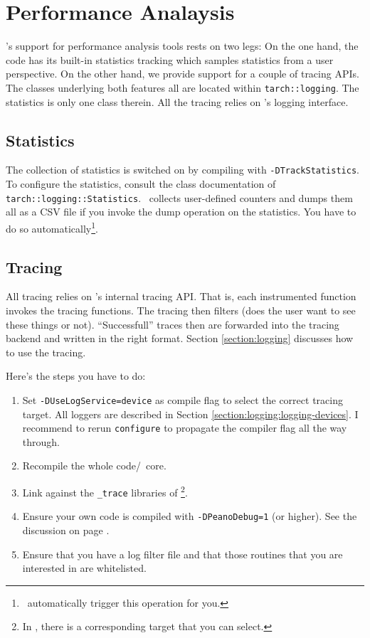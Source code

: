 \chapter{Performance Analaysis}
\label{capter:performance-analysis}


\Peano's support for performance analysis tools rests on two legs:
On the one hand, the code has its built-in statistics tracking which samples
statistics from a user perspective.
On the other hand, we provide support for a couple of tracing APIs.
The classes underlying both features all are located within
\texttt{tarch::logging}.
The statistics is only one class therein.
All the tracing relies on \Peano's logging interface.


\section{Statistics}

The collection of statistics is switched on by compiling with
\texttt{-DTrackStatistics}.
To configure the statistics, consult the class documentation of
\texttt{tarch::logging::Statistics}.
\Peano\ collects user-defined counters and dumps them all as a CSV file if you
invoke the dump operation on the statistics. 
You have to do so automatically\footnote{\ExaHyPE\ automatically trigger this
operation for you.}.



\section{Tracing}


All tracing relies on \Peano's internal tracing API.
That is, each instrumented function invokes the tracing functions.
The tracing then filters (does the user want to see these things or not).
``Successfull'' traces then are forwarded into the tracing backend and written
in the right format.
Section \ref{section:logging} discusses how to use the tracing.


Here's the steps you have to do:
\begin{enumerate}
  \item Set \texttt{-DUseLogService=device} as compile flag to select the
  correct tracing target. All loggers are described in Section
  \ref{section:logging:logging-devices}. I recommend to rerun \texttt{configure}
  to propagate the compiler flag all the way through.
  \item Recompile the whole code/\Peano\ core.
  \item Link against the \texttt{\_trace} libraries of \Peano\footnote{In
  \ExaHyPE, there is a corresponding target that you can select.}.
  \item Ensure your own code is compiled with \texttt{-DPeanoDebug=1} (or
  higher). See the discussion on page \pageref{section:logging}.
  \item Ensure that you have a log filter file and that those routines that you
  are interested in are whitelisted.
\end{enumerate}





